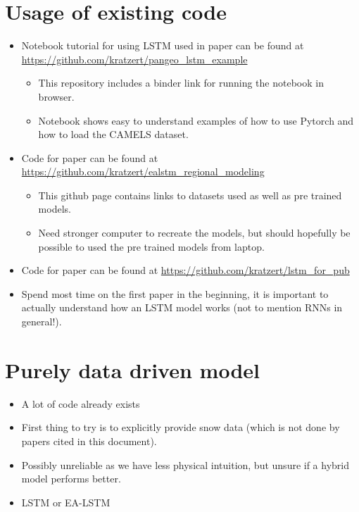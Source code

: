 \documentclass[a4paper,12pt,english]{article}
\begin{document}
\section*{Usage of existing code}
\begin{itemize}
\item Notebook tutorial for using LSTM used in paper \cite{lstm_first_paper} can be found at \url{https://github.com/kratzert/pangeo_lstm_example}
\begin{itemize}
\item This repository includes a binder link for running the notebook in browser.
\item Notebook shows easy to understand examples of how to use Pytorch and how to load the CAMELS dataset.
\end{itemize}
\item Code for paper \cite{lstm_second_paper} can be found at \url{https://github.com/kratzert/ealstm_regional_modeling}
\begin{itemize}
\item This github page contains links to datasets used as well as pre trained models. 
\item Need stronger computer to recreate the models, but should hopefully be possible to used the pre trained models from laptop.
\end{itemize}
\item Code for paper \cite{lstm_third_paper} can be found at \url{https://github.com/kratzert/lstm_for_pub}
\item Spend most time on the first paper in the beginning, it is important to actually understand how an LSTM model works (not to mention RNNs in general!).
\end{itemize}

\section*{Purely data driven model}
\begin{itemize}
\item A lot of code already exists
\item First thing to try is to explicitly provide snow data (which is not done by papers cited in this document).
\item Possibly unreliable as we have less physical intuition, but unsure if a hybrid model performs better.
\item LSTM or EA-LSTM
\end{itemize}
\end{document}
